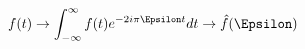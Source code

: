 \documentclass[preview]{standalone}
\begin{document}
\begin{align*}
f(t)\rightarrow  \int_{-\infty}^{\infty}f(t)e^{-2 i \pi \Epsilon t} dt  \rightarrow\hat{f}(\Epsilon)
\end{align*}
\end{document}
